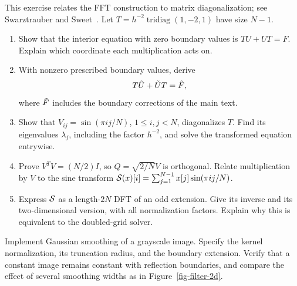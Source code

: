 
\begin{exo}
\label{exo-formulation-matrix-fish}
This exercise relates the FFT construction to matrix diagonalization; see
Swarztrauber and Sweet~\cite{swarztrauber}.
Let $T=h^{-2}\operatorname{tridiag}(1,-2,1)$ have size $N-1$.
\begin{enumerate}
\item Show that the interior equation with zero boundary values is
$TU+UT=F$. Explain which coordinate each multiplication acts on.
\item With nonzero prescribed boundary values, derive
\begin{equation}
\label{eqn-exo-matrix-formulation-1}
 T\tilde{U}+\tilde{U}T=\tilde{F},
\end{equation}
where $\tilde{F}$ includes the boundary corrections of the main text.
\item Show that $V_{ij}=\sin(\pi ij/N)$, $1\leq i,j<N$, diagonalizes $T$.
Find its eigenvalues $\lambda_j$, including the factor $h^{-2}$, and solve
the transformed equation entrywise.
\item Prove $V^TV=(N/2)I$, so $Q=\sqrt{2/N}V$ is orthogonal.
Relate multiplication by $V$ to the sine transform
$\mathcal{S}(x)[i]=\sum_{j=1}^{N-1}x[j]\sin(\pi ij/N)$.
\item Express $\mathcal{S}$ as a length-$2N$ DFT of an odd extension.
Give its inverse and its two-dimensional version, with all normalization
factors. Explain why this is equivalent to the doubled-grid solver.
\end{enumerate}
\end{exo}


\begin{exo}
\label{exo-lissage-image}
Implement Gaussian smoothing of a grayscale image. Specify the kernel
normalization, its truncation radius, and the boundary extension.
Verify that a constant image remains constant with reflection boundaries,
and compare the effect of several smoothing widths as in
Figure~\ref{fig-filter-2d}.
\end{exo}


